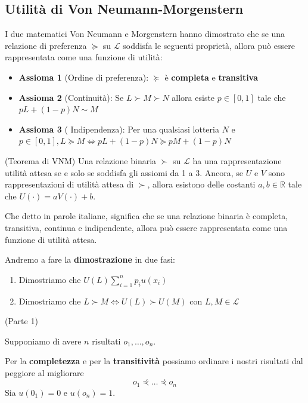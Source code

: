 \subsection{Utilità di Von Neumann-Morgenstern}

I due matematici Von Neumann e Morgenstern hanno dimostrato che se una
relazione di preferenza $\succcurlyeq$ su $\mathcal{L}$ soddisfa le seguenti
proprietà, allora può essere rappresentata come una funzione di utilità:
\begin{itemize}
    \item \textbf{Assioma 1} (Ordine di preferenza): $\succcurlyeq$ è \textbf{completa} e \textbf{transitiva}
    \item \textbf{Assioma 2} (Continuità): Se $L \succ M \succ N$ allora esiste $p \in [0,1]$ tale che $pL + (1-p)N \sim M$
    \item \textbf{Assioma 3} ( Indipendenza): Per una qualsiasi lotteria $N$ e $p \in [0,1], L \succcurlyeq M \iff pL + (1-p)N \succcurlyeq pM + (1-p)N$
\end{itemize}

\begin{theorem}(Teorema di VNM)
    Una relazione binaria $\succ$ su $\mathcal{L}$ ha una rappresentazione utilità attesa se e solo se soddisfa gli assiomi da 1 a 3. Ancora, se $U$ e $V$ sono
    rappresentazioni di utilità attesa di $\succ$, allora esistono delle costanti $a,b \in \mathbb{R}$ tale che $U(\cdot) = aV(\cdot)+b$.
\end{theorem}

Che detto in parole italiane, significa che se una relazione binaria è
completa, transitiva, continua e indipendente, allora può essere rappresentata
come una funzione di utilità attesa.

Andremo a fare la \textbf{dimostrazione} in due fasi:
\begin{enumerate}
    \item Dimostriamo che $U(L) \sum_{i=1}^n p_i u(x_i)$
    \item Dimostriamo che $L \succ M \iff U(L) \succ U(M)$ con $L,M \in \mathcal{L}$
\end{enumerate}

\begin{dimostrazione}(Parte 1)
\end{dimostrazione}
Supponiamo di avere $n$ risultati $o_1, \dots, o_n$.

Per la \textbf{completezza} e per la \textbf{transitività} possiamo ordinare i
nostri risultati dal peggiore al migliorare
\[
    o_1 \curlyeqprec \dots \curlyeqprec o_n
\]
Sia $u(0_1) = 0$ e $u(o_n) = 1$.


